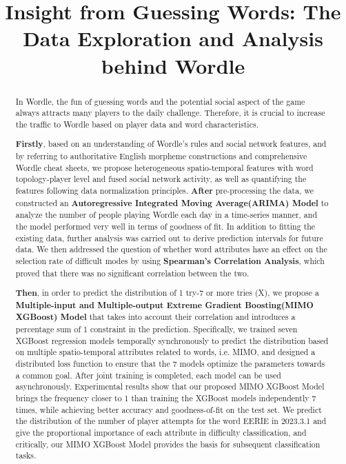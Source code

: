 \documentclass[12pt]{article}  %
\title{Insight from Guessing Words: The Data Exploration and Analysis behind Wordle}  %
\begin{document}
\begin{abstract}
    In Wordle, the fun of guessing words and the potential social aspect of the game always attracts many players to the daily challenge. Therefore, it is crucial to increase the traffic to Wordle based on player data and word characteristics.
    
    \textbf{Firstly}, based on an understanding of Wordle's rules and social network features, and by referring to authoritative English morpheme constructions and comprehensive Wordle cheat sheets, we propose heterogeneous spatio-temporal features with word topology-player level and fused social network activity, as well as quantifying the features following data normalization principles. \textbf{After} pre-processing the data, we constructed an \textbf{Autoregressive Integrated Moving Average(ARIMA) Model} to analyze the number of people playing Wordle each day in a time-series manner, and the model performed very well in terms of goodness of fit. In addition to fitting the existing data, further analysis was carried out to derive prediction intervals for future data. We then addressed the question of whether word attributes have an effect on the selection rate of difficult modes by using \textbf{Spearman's Correlation Analysis}, which proved that there was no significant correlation between the two.

    \textbf{Then}, in order to predict the distribution of 1 try-7 or more tries (X), we propose a \textbf{Multiple-input and Multiple-output Extreme Gradient Boosting(MIMO XGBoost) Model} that takes into account their correlation and introduces a percentage sum of 1 constraint in the prediction. Specifically, we trained seven XGBoost regression models temporally synchronously to predict the distribution based on multiple spatio-temporal attributes related to words, i.e. MIMO, and designed a distributed loss function to ensure that the 7 models optimize the parameters towards a common goal. After joint training is completed, each model can be used asynchronously. Experimental results show that our proposed MIMO XGBoost Model brings the frequency closer to 1 than training the XGBoost models independently 7 times, while achieving better accuracy and goodness-of-fit on the test set. We predict the distribution of the number of player attempts for the word EERIE in 2023.3.1 and give the proportional importance of each attribute in difficulty classification, and critically, our MIMO XGBoost Model provides the basis for subsequent classification tasks.


\end{abstract}
\end{document}
